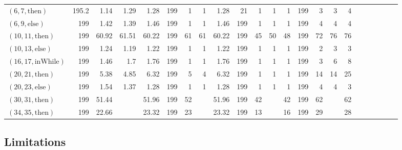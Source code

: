 \documentclass[sigconf]{acmart}
\newcommand{\thenBr}{\text{then}}
\newcommand{\elseBr}{\text{else}}
\newcommand{\inWhile}{\text{inWhile}}
\begin{document}
\begin{table*}
{\begin{tabular}{l|rrrr|rrrr|rrrr|rrrr|r|r|r|r|r|r}
    $(6,7,\thenBr)$    & 195.2       & 1.14       & 1.29          & 1.28           & 199   & 1     & 1       & 1.28    & 21        & 1        & 1         & 1           & 199      & 3        & 3         & 4 & & & & & & \\
    $(6,9,\elseBr)$    & 199         & 1.42       & 1.39          & 1.46           & 199   & 1     & 1       & 1.46    & 199       & 1        & 1         & 1           & 199      & 4        & 4         & 4 & & & & & & \\
    $(10,11,\thenBr)$  & 199         & 60.92      & 61.51         & 60.22          & 199   & 61    & 61      & 60.22   & 199       & 45       & 50        & 48          & 199      & 72       & 76        & 76 & & & & & & \\
    $(10,13,\elseBr)$  & 199         & 1.24       & 1.19          & 1.22           & 199   & 1     & 1       & 1.22    & 199       & 1        & 1         & 1           & 199      & 2        & 3         & 3 & & & & & & \\
    $(16,17,\inWhile)$ & 199         & 1.46       & 1.7           & 1.76           & 199   & 1     & 1       & 1.76    & 199       & 1        & 1         & 1           & 199      & 3        & 6         & 8 & & & & & & \\
    $(20,21,\thenBr)$  & 199         & 5.38       & 4.85          & 6.32           & 199   & 5     & 4       & 6.32    & 199       & 1        & 1         & 1           & 199      & 14       & 14        & 25 & & & & & & \\
    $(20,23,\elseBr)$  & 199         & 1.54       & 1.37          & 1.28           & 199   & 1     & 1       & 1.28    & 199       & 1        & 1         & 1           & 199      & 4        & 4         & 3 & & & & & & \\
    $(30,31,\thenBr)$  & 199         & 51.44      &               & 51.96          & 199   & 52    &         & 51.96   & 199       & 42       &           & 42          & 199      & 62       &           & 62 & & & & & & \\
    $(34,35,\thenBr)$  & 199         & 22.66      &               & 23.32          & 199   & 23    &         & 23.32   & 199       & 13       &           & 16          & 199      & 29       &           & 28 & & & & & & \\
    \bottomrule
    \end{tabular}
}
\end{table*}


\subsection{Limitations}
\label{sub.sec.eval.limit}
\end{document}

